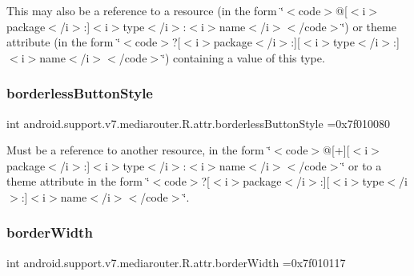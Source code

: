 This may also be a reference to a resource (in the form \char`\"{}$<$code$>$@\mbox{[}$<$i$>$package$<$/i$>$\+:\mbox{]}$<$i$>$type$<$/i$>$\+:$<$i$>$name$<$/i$>$$<$/code$>$\char`\"{}) or theme attribute (in the form \char`\"{}$<$code$>$?\mbox{[}$<$i$>$package$<$/i$>$\+:\mbox{]}\mbox{[}$<$i$>$type$<$/i$>$\+:\mbox{]}$<$i$>$name$<$/i$>$$<$/code$>$\char`\"{}) containing a value of this type. \mbox{\label{classandroid_1_1support_1_1v7_1_1mediarouter_1_1R_1_1attr_ad2cab4a93ee5938fca8062352d185a11}} 
\subsubsection{\texorpdfstring{borderless\+Button\+Style}{borderlessButtonStyle}}
{\footnotesize\ttfamily int android.\+support.\+v7.\+mediarouter.\+R.\+attr.\+borderless\+Button\+Style =0x7f010080\hspace{0.3cm}{\ttfamily [static]}}

Must be a reference to another resource, in the form \char`\"{}$<$code$>$@\mbox{[}+\mbox{]}\mbox{[}$<$i$>$package$<$/i$>$\+:\mbox{]}$<$i$>$type$<$/i$>$\+:$<$i$>$name$<$/i$>$$<$/code$>$\char`\"{} or to a theme attribute in the form \char`\"{}$<$code$>$?\mbox{[}$<$i$>$package$<$/i$>$\+:\mbox{]}\mbox{[}$<$i$>$type$<$/i$>$\+:\mbox{]}$<$i$>$name$<$/i$>$$<$/code$>$\char`\"{}. \mbox{\label{classandroid_1_1support_1_1v7_1_1mediarouter_1_1R_1_1attr_a5fab87200d63b1590fc241cc86ba4474}} 
\subsubsection{\texorpdfstring{border\+Width}{borderWidth}}
{\footnotesize\ttfamily int android.\+support.\+v7.\+mediarouter.\+R.\+attr.\+border\+Width =0x7f010117\hspace{0.3cm}{\ttfamily [static]}}

